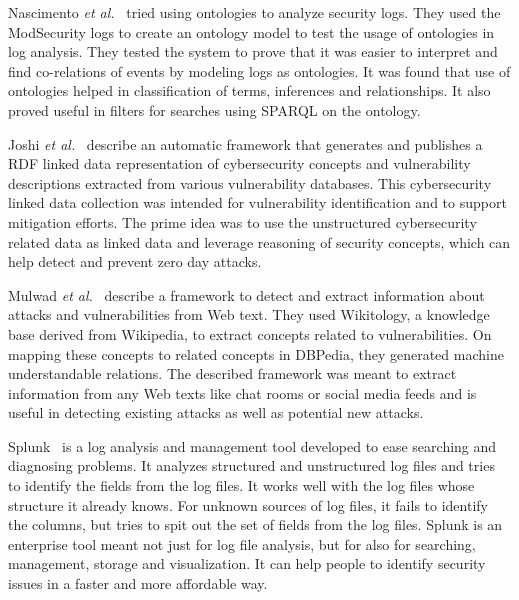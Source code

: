Nascimento \emph{et al.}~\cite{ontolog} tried using ontologies to analyze security logs. They used the ModSecurity logs to create an ontology model to test the usage of ontologies in log analysis. They tested the system to prove that it was easier to interpret and find co-relations of events by modeling logs as ontologies. It was found that use of ontologies helped in classification of terms, inferences and relationships. It also proved useful in filters for searches using SPARQL on the ontology.

Joshi \emph{et al.}~\cite{joshi2013extracting} describe an automatic framework that generates and publishes a RDF linked data representation of cybersecurity concepts and vulnerability descriptions extracted from various vulnerability databases. This cybersecurity linked data collection was intended for vulnerability identification and to support mitigation efforts. The prime idea was to use the unstructured cybersecurity related data as linked data and leverage reasoning of security concepts, which can help detect and prevent zero day attacks.

Mulwad \emph{et al.}~\cite{mulwad2011extracting} describe a framework to detect and extract information about attacks and vulnerabilities from Web text. They used Wikitology, a knowledge base derived from Wikipedia, to extract concepts related to vulnerabilities. On mapping these concepts to related concepts in DBPedia, they generated machine understandable relations. The described framework was meant to extract information from any Web texts like chat rooms or social media feeds and is useful in detecting existing attacks as well as potential new attacks.

Splunk~\cite{splunk} is a log analysis and management tool developed to ease searching and diagnosing problems. It analyzes structured and unstructured log files and tries to identify the fields from the log files. It works well with the log files whose structure it already knows. For unknown sources of log files, it fails to identify the columns, but tries to spit out the set of fields from the log files. Splunk is an enterprise tool meant not just for log file analysis, but for also for searching, management, storage and visualization. It can help people to identify security issues in a faster and more affordable way.
